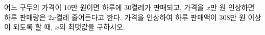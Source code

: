 \hspace*{2mm}\begin{minipage}[t]{\dimexpr\linewidth-2mm\relax}\vspace{0pt}
어느 구두의 가격이 $10$만 원이면 하루에 $30$켤레가 판매되고, 가격을 $x$만 원 인상하면 하루 판매량은 $2x$켤레 줄어든다고 한다. 가격을 인상하여 하루 판매액이 $308$만 원 이상이 되도록 할 때, $x$의 최댓값을 구하시오.\end{minipage}
